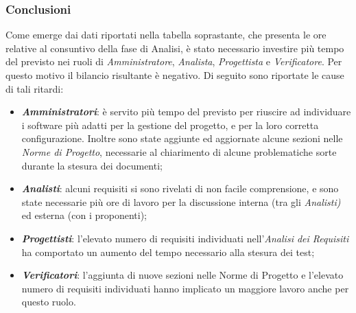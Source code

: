 \subsubsection{Conclusioni}
Come emerge dai dati riportati nella tabella soprastante, che presenta le ore relative al consuntivo della fase di Analisi, è stato necessario investire più tempo del previsto nei ruoli di \textit{Amministratore}, \textit{Analista}, \textit{Progettista} e \textit{Verificatore}. Per questo motivo il bilancio risultante è negativo. Di seguito sono riportate le cause di tali ritardi:
\begin{itemize}
	\item \textbf{\textit{Amministratori}}: è servito più tempo del previsto per riuscire ad individuare i software più adatti per la gestione del progetto, e per la loro corretta configurazione. Inoltre sono state aggiunte ed aggiornate alcune sezioni nelle \textit{Norme di Progetto}, necessarie al chiarimento di alcune problematiche sorte durante la stesura dei documenti;
	\item \textbf{\textit{Analisti}}: alcuni requisiti si sono rivelati di non facile comprensione, e sono state necessarie più ore di lavoro per la discussione interna (tra gli \textit{Analisti)} ed esterna (con i proponenti); 
	\item \textbf{\textit{Progettisti}}: l'elevato numero di requisiti individuati nell'\textit{Analisi dei Requisiti} ha comportato un aumento del tempo necessario alla stesura dei test;
	\item \textbf{\textit{Verificatori}}: l'aggiunta di nuove sezioni nelle Norme di Progetto e l'elevato numero di requisiti individuati hanno implicato un maggiore lavoro anche per questo ruolo. 
\end{itemize}